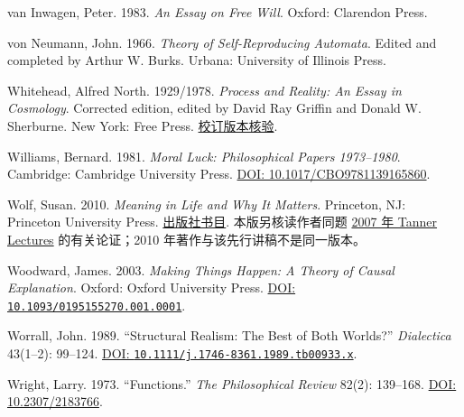 \documentclass[
  11pt,
  oneside]{book}
\begin{document}
van Inwagen, Peter. 1983. \emph{An Essay on Free Will}. Oxford: Clarendon Press.

von Neumann, John. 1966. \emph{Theory of Self-Reproducing Automata}. Edited and completed by Arthur W. Burks. Urbana: University of Illinois Press.

Whitehead, Alfred North. 1929/1978. \emph{Process and Reality: An Essay in Cosmology}. Corrected edition, edited by David Ray Griffin and Donald W. Sherburne. New York: Free Press. \href{https://whiteheadresearch.org/research/contemporary-whitehead-studies/proposals/suggested-editions/}{校订版本核验}.

Williams, Bernard. 1981. \emph{Moral Luck: Philosophical Papers 1973--1980}. Cambridge: Cambridge University Press. \href{https://doi.org/10.1017/CBO9781139165860}{DOI: 10.1017/CBO9781139165860}.

Wolf, Susan. 2010. \emph{Meaning in Life and Why It Matters}. Princeton, NJ: Princeton University Press. \href{https://press.princeton.edu/books/paperback/9780691154503/meaning-in-life-and-why-it-matters}{出版社书目}. 本版另核读作者同题 \href{https://tannerlectures.org/documents/meaning-in-life-and-why-it-matters/}{2007 年 Tanner Lectures} 的有关论证；2010 年著作与该先行讲稿不是同一版本。

Woodward, James. 2003. \emph{Making Things Happen: A Theory of Causal Explanation}. Oxford: Oxford University Press. \href{https://doi.org/10.1093/0195155270.001.0001}{DOI: \nolinkurl{10.1093/0195155270.001.0001}}.

Worrall, John. 1989. ``Structural Realism: The Best of Both Worlds?'' \emph{Dialectica} 43(1--2): 99--124. \href{https://doi.org/10.1111/j.1746-8361.1989.tb00933.x}{DOI: \nolinkurl{10.1111/j.1746-8361.1989.tb00933.x}}.

Wright, Larry. 1973. ``Functions.'' \emph{The Philosophical Review} 82(2): 139--168. \href{https://doi.org/10.2307/2183766}{DOI: 10.2307/2183766}.

\par\endgroup

\backmatter
\end{document}
